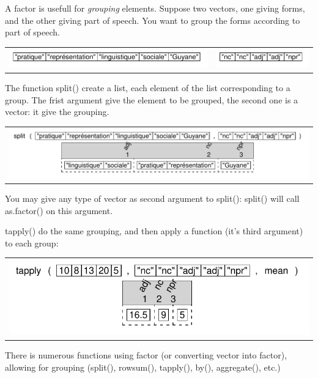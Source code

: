 \documentclass[pdflatex]{article}
\begin{document}
A factor is usefull for \emph{grouping} elements. Suppose two vectors, one
giving forms, and the other giving part of speech. You want to group the forms
according to part of speech. 

\begin{tabular}{cc}
\includegraphics{forms1} & \includegraphics{pos1}\\
\end{tabular}

The function split() create a list, each element
of the list corresponding to a group. The frist argument give the element to be
grouped, the second one is a vector: it give the grouping.

\begin{tabular}{c}
\includegraphics{split2}
\end{tabular}

You may give any type of vector as second argument to split(): split() will
call as.factor() on this argument.

tapply() do the same grouping, and then apply a function (it's third argument)
to each group:

\begin{tabular}{c}
\includegraphics{tapply}
\end{tabular}

There is numerous functions using factor (or converting vector into factor),
allowing for grouping (split(), rowsum(), tapply(), by(), aggregate(), etc.)
\end{document}

